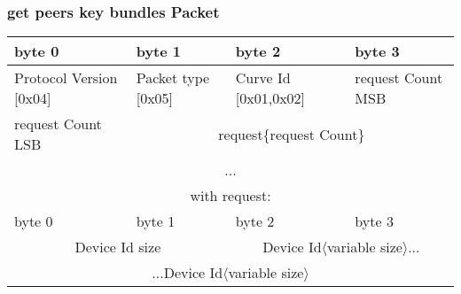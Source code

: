 \documentclass[a4paper,11pt]{article}
\begin{document}
    \subsubsection{get peers key bundles Packet}
      \begin{center}
      \begin{tabular}{ | p{1.4in} | p{1.4in} | p{1.4in} | p{1.4in} |}
        \hline
        \cellcolor[gray]{0.85} byte 0 & \cellcolor[gray]{0.85} byte 1 & \cellcolor[gray]{0.85} byte 2 & \cellcolor[gray]{0.85}byte 3\\
        \hline
        Protocol Version [0x04] & Packet type [0x05] & Curve Id [0x01,0x02] & request Count MSB\\
        \hline
        request Count LSB & \multicolumn{3}{|c|}{request\{request Count\}}\\
        \cline{1-1}
        \multicolumn{4}{|c|}{...}\\
        \hline
        \multicolumn{4}{c}{with request:}\\
        \hline
        \cellcolor[gray]{0.95} byte 0 & \cellcolor[gray]{0.95} byte 1 & \cellcolor[gray]{0.95} byte 2 & \cellcolor[gray]{0.95}byte 3\\
        \hline
        \multicolumn{2}{|c|}{Device Id size}&\multicolumn{2}{|c|}{Device Id$\langle$variable size$\rangle$...}\\
        \hline
        \multicolumn{4}{|c|}{...Device Id$\langle$variable size$\rangle$}\\
        \hline
      \end{tabular}
      \end{center}
    
\end{document}
